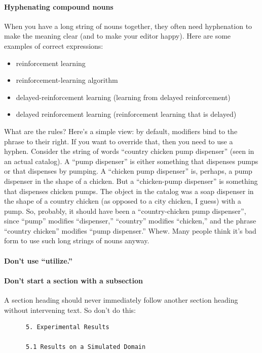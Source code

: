 \documentclass[twoside,11pt]{article}
\begin{document}
\paragraph{Hyphenating compound nouns}
When you have a long string of nouns together, they often need hyphenation to make the meaning clear (and to make your editor happy). Here are some examples of correct expressions: 
\begin{itemize}
\item reinforcement learning 
\item reinforcement-learning algorithm 
\item delayed-reinforcement learning (learning from delayed reinforcement) 
\item delayed reinforcement learning (reinforcement learning that is delayed) 
\end{itemize}
What are the rules? Here's a simple view: by default, modifiers bind to the phrase to their right. If you want to override that, then you need to use a hyphen. Consider the string of words ``country chicken pump dispenser'' (seen in an actual catalog). A ``pump dispenser'' is either something that dispenses pumps or that dispenses by pumping. A ``chicken pump dispenser'' is, perhaps, a pump dispenser in the shape of a chicken. But a ``chicken-pump dispenser'' is something that dispenses chicken pumps. The object in the catalog was a soap dispenser in the shape of a country chicken (as opposed to a city chicken, I guess) with a pump. So, probably, it should have been a ``country-chicken pump dispenser'', since ``pump'' modifies ``dispenser,'' ``country'' modifies ``chicken,'' and the phrase ``country chicken'' modifies ``pump dispenser.'' Whew. Many people think it's bad form to use such long strings of nouns anyway. 

\paragraph{Don't use ``utilize.''}

\paragraph{Don't start a section with a subsection}
A section heading should never immediately follow another section heading without intervening text. So don't do this: 
\begin{verbatim}      5. Experimental Results 

      5.1 Results on a Simulated Domain 
\end{verbatim}
\end{document}
